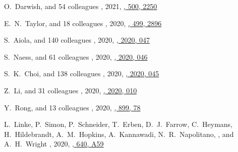 \begin{etaremune}
\item
O.~Darwish, and 54 colleagues
,
2021, \href{https://ui.adsabs.harvard.edu/abs/2021MNRAS.500.2250D}{\mnras, 500, 2250}

\item
E.~N.~Taylor, and 18 colleagues
,
2020, \href{https://ui.adsabs.harvard.edu/abs/2020MNRAS.499.2896T}{\mnras, 499, 2896}

\item
S.~Aiola, and 140 colleagues
,
2020, \href{https://ui.adsabs.harvard.edu/abs/2020JCAP...12..047A}{\jcap, 2020, 047}

\item
S.~Naess, and 61 colleagues
,
2020, \href{https://ui.adsabs.harvard.edu/abs/2020JCAP...12..046N}{\jcap, 2020, 046}

\item
S.~K.~Choi, and 138 colleagues
,
2020, \href{https://ui.adsabs.harvard.edu/abs/2020JCAP...12..045C}{\jcap, 2020, 045}

\item
Z.~Li, and 31 colleagues
,
2020, \href{https://ui.adsabs.harvard.edu/abs/2020JCAP...09..010L}{\jcap, 2020, 010}

\item
Y.~Rong, and 13 colleagues
,
2020, \href{https://ui.adsabs.harvard.edu/abs/2020ApJ...899...78R}{\apj, 899, 78}

\item
L.~Linke, P.~Simon, P.~Schneider, T.~Erben, D.~J.~Farrow, C.~Heymans, H.~Hildebrandt, A.~M.~Hopkins, A.~Kannawadi, N.~R.~Napolitano, \myself, and A.~H.~Wright
,
2020, \href{https://ui.adsabs.harvard.edu/abs/2020A&A...640A..59L}{\aap, 640, A59}


\end{etaremune}
